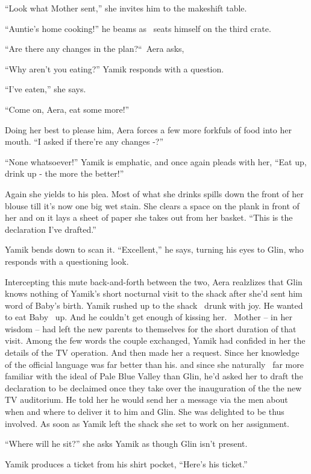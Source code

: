 \documentclass[twoside,11pt]{book}
\begin{document}
``Look what Mother sent,'' she invites him to the makeshift table.

``Auntie's home cooking!'' he beams as \ seats himself on the third crate.

``Are there any changes in the plan?``~Aera asks,

``Why aren't you eating?'' Yamik responds with a question.

``I've eaten,'' she says. ~

``Come on, Aera, eat some more!'' \

Doing her best to please him, Aera forces a few more forkfuls of food into her mouth. ``I asked if there're
any changes -?''

``None whatsoever!'' Yamik is emphatic, and once again pleads with her, ``Eat up, drink up
-{ }the more the better!''

Again she yields to his plea. Most of what she drinks spills down the front of her blouse till it's now one big wet
stain. She clears a space on the plank in front of her and on it lays a sheet of paper she takes out from her basket.
``This is the declaration I've drafted.''

Yamik bends down to scan it. ``Excellent,'' he says, turning his eyes to Glin, who responds
with a questioning look.

Intercepting this mute back-and-forth between the two, Aera realzlizes that Glin knows nothing of Yamik's short
nocturnal visit to the shack after she'd sent him word of Baby's birth. Yamik rushed up to the shack \ drunk with joy.
He wanted to eat Baby \ up. And he{ }couldn't get enough of kissing her. ~Mother -- in her wisdom -- had
left the new parents to themselves for the short duration of that visit. Among the few words the couple exchanged,
Yamik had confided in her the details of the TV operation. And then made her a request. Since her knowledge of the
official language was far better than his. and since she naturally \ far more familiar with the ideal of Pale Blue
Valley than Glin, he'd asked her to draft the declaration to be declaimed once they take over the inauguration of the
the new TV auditorium. He told her he would send her a message via the men about when and where to deliver it to him
and Glin. She was delighted to be thus involved. As soon as Yamik left the shack she set to work on her
assignment{. }

``Where will he sit?'' she asks Yamik as though Glin isn't present.

Yamik produces a ticket from his shirt pocket, ``Here's his ticket.''
\end{document}
